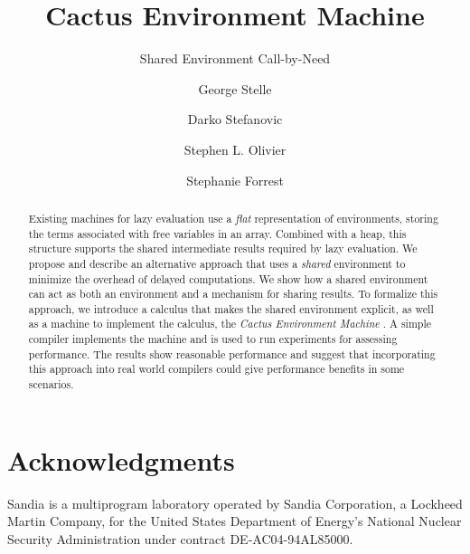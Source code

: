 \documentclass{llncs}
\begin{document}
\title{Cactus Environment Machine}
\subtitle{Shared Environment Call-by-Need}

\author{George Stelle \and Darko Stefanovic 
        \and Stephen L. Olivier 
        \and Stephanie Forrest
        }
      

\maketitle

\begin{abstract}
Existing machines for lazy evaluation use a \emph{flat} representation of
environments, storing the terms associated with free variables in an array.
Combined with a heap, this structure supports the shared intermediate results
required by lazy evaluation.  We propose and describe an alternative
approach that uses a \emph{shared} environment to minimize the overhead of
delayed computations. We show how a shared environment can act as both an
environment and a mechanism for sharing results. To formalize this approach, we
introduce a calculus that makes the shared environment explicit, as well as
a machine to implement the calculus, the \emph{Cactus Environment Machine}
. A simple compiler implements the machine and is used to run experiments for
assessing performance. The results show reasonable performance and suggest that
incorporating this approach into real world compilers could give performance
benefits in some scenarios.
\end{abstract}












\section{Acknowledgments}
Sandia is a multiprogram laboratory operated by Sandia Corporation, a Lockheed
Martin Company, for the United States Department of Energy’s National Nuclear
Security Administration under contract DE-AC04-94AL85000.




% 
\end{document}
